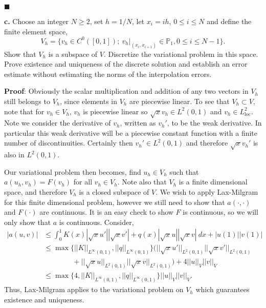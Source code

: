 \documentclass[11pt]{article}
\begin{document}
$\blacksquare$

\vskip 2cm


{\bf c.} Choose an integer $N \geq 2$, set $h = 1/N$, let $x_i = ih$, $0 \leq i \leq N$ and define the finite element space,
\begin{equation}
    V_h = \{ v_h \in C^0([0,1]); \: v_h|_{(x_i, x_{i+1})} \in \mathbb{P}_1, 0 \leq i \leq N-1 \}.
\end{equation}
Show that $V_h$ is a subspace of $V$. 
Discretize the variational problem in this space. 
Prove existence and uniqueness of the discrete solution and establish an error estimate without estimating the norms of the interpolation errors.


\vskip 1cm

{\bf Proof}: Obviously the scalar multiplication and addition of any two vectors in $V_h$ still belongs to $V_h$, since elements in $V_h$ are piecewise linear. 
To see that $V_h \subset V$, note that for $v_h \in V_h$, $v_h$ is piecewise linear so $\sqrt{x} v_h \in L^2(0,1)$ and $v_h \in L^2_{\text{loc}}$. 
Note we consider the derivative of $v_h$, written as $v_h'$, to be the weak derivative.
In particular this weak derivative will be a piecewise constant function with a finite number of discontinuities.
Certainly then $v_h' \in L^2(0,1)$ and therefore $\sqrt{x} v_h'$ is also in $L^2(0,1)$.

Our variational problem then becomes, find $u_h \in V_h$ such that $a(u_h, v_h) = F(v_h)$ for all $v_h \in V_h$.
Note also that $V_h$ is a finite dimensional space, and therefore $V_h$ is a closed subspace of $V$. 
We wish to apply Lax-Milgram for this finite dimensional problem, however we still need to show that $a(\cdot, \cdot)$ and $F(\cdot)$ are continuous.
It is an easy check to show $F$ is continuous, so we will only show that $a$ is continuous.
Consider,
\begin{align}
	|a(u,v)| &\leq \int_0^1  K(x) |\sqrt{x}u'| |\sqrt{x} v'| + q(x) |\sqrt{x}u| |\sqrt{x}v| \: dx + |u(1)| |v(1)| \\
	&\leq \max\{||K||_{L^\infty(0,1)}, ||q||_{L^\infty(0,1)} \} \big(||\sqrt{x} u'||_{L^2(0,1)} ||\sqrt{x} v'||_{L^2(0,1)} \\
	&\qquad\qquad + ||\sqrt{x} u||_{L^2(0,1)} ||\sqrt{x} v||_{L^2(0,1)} \big) + 4 ||u||_V ||v||_V \\
	&\leq \max\{4, ||K||_{L^\infty(0,1)}, ||q||_{L^\infty(0,1)} \} ||u||_V ||v||_V.
\end{align}
Thus, Lax-Milgram applies to the variational problem on $V_h$ which guarantees existence and uniqueness.
\end{document}
